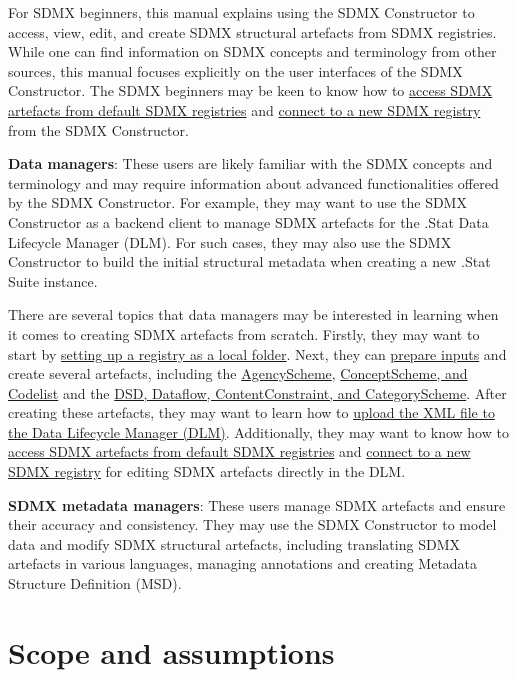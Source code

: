 \documentclass[
]{book}
\theoremstyle{definition}
\theoremstyle{definition}
\theoremstyle{definition}
\theoremstyle{definition}
\theoremstyle{remark}
\begin{document}
For SDMX beginners, this manual explains using the SDMX Constructor to access, view, edit, and create SDMX structural artefacts from SDMX registries. While one can find information on SDMX concepts and terminology from other sources, this manual focuses explicitly on the user interfaces of the SDMX Constructor. The SDMX beginners may be keen to know how to \protect\hyperlink{accessing-sdmx}{access SDMX artefacts from default SDMX registries} and \protect\hyperlink{connect-to}{connect to a new SDMX registry} from the SDMX Constructor.

\textbf{Data managers}: These users are likely familiar with the SDMX concepts and terminology and may require information about advanced functionalities offered by the SDMX Constructor. For example, they may want to use the SDMX Constructor as a backend client to manage SDMX artefacts for the .Stat Data Lifecycle Manager (DLM). For such cases, they may also use the SDMX Constructor to build the initial structural metadata when creating a new .Stat Suite instance.

There are several topics that data managers may be interested in learning when it comes to creating SDMX artefacts from scratch. Firstly, they may want to start by \protect\hyperlink{setting-up}{setting up a registry as a local folder}. Next, they can \protect\hyperlink{preparing-inputs}{prepare inputs} and create several artefacts, including the \protect\hyperlink{creating-agencyscheme}{AgencyScheme}, \protect\hyperlink{creating-conceptscheme}{ConceptScheme, and Codelist} and the \protect\hyperlink{creating-dsd}{DSD, Dataflow, ContentConstraint, and CategoryScheme}. After creating these artefacts, they may want to learn how to \protect\hyperlink{upload-the}{upload the XML file to the Data Lifecycle Manager (DLM)}. Additionally, they may want to know how to \protect\hyperlink{accessing-sdmx}{access SDMX artefacts from default SDMX registries} and \protect\hyperlink{connect-to}{connect to a new SDMX registry} for editing SDMX artefacts directly in the DLM.

\textbf{SDMX metadata managers}: These users manage SDMX artefacts and ensure their accuracy and consistency. They may use the SDMX Constructor to model data and modify SDMX structural artefacts, including translating SDMX artefacts in various languages, managing annotations and creating Metadata Structure Definition (MSD).

\hypertarget{scope-and-assumptions}{%
\section*{Scope and assumptions}\label{scope-and-assumptions}}
\end{document}
